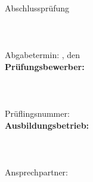 \begin{titlepage}

\begin{center}
\Large{\ihkName}\\[1ex]
\Large{Abschlussprüfung \pruefungstermin}\\[3ex]

\Large{\ausbildungsberuf}\\
\LARGE{\betreff}\\[4ex]

\huge{\textbf{\titel}}\\[4ex]

\normalsize
Abgabetermin: \abgabeOrt, den \abgabeTermin\\[3em]
\textbf{Prüfungsbewerber:}\\
\autorName\\
\autorAnschrift\\
\autorOrt\\
Prüflingsnummer: \prueflingsnummer\\[5ex]

\textbf{Ausbildungsbetrieb:}\\
\betriebName\\
\betriebAnschrift\\
\betriebOrt\\
Ansprechpartner: \betriebAnsprechpartner\\[5em]
\end{center}

\end{titlepage}
